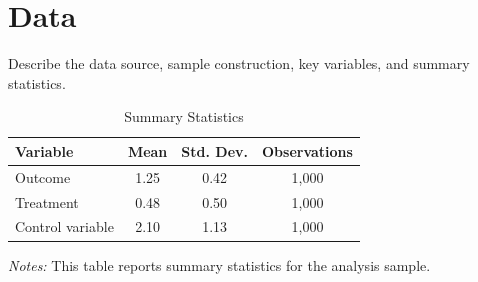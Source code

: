 \documentclass[11pt]{article}                 %
\begin{document}
\section{Data}\label{sec:data}

Describe the data source, sample construction, key variables, and summary statistics.

\begin{table}[htbp]                           %

\centering                                    %

\caption{Summary Statistics}                  %
\label{tab:summary}                           %

\begin{threeparttable}                        %

\begin{tabular}{lccc}                         %

\toprule                                      %

Variable & Mean & Std. Dev. & Observations \\ %

\midrule                                      %

Outcome & 1.25 & 0.42 & 1,000 \\              %
Treatment & 0.48 & 0.50 & 1,000 \\            %
Control variable & 2.10 & 1.13 & 1,000 \\     %

\bottomrule                                   %

\end{tabular}                                 %

\begin{tablenotes}[flushleft]                 %

\footnotesize                                 %

\item \textit{Notes:} This table reports summary statistics for the analysis sample.

\end{tablenotes}                              %
\end{threeparttable}                          %
\end{table}                                   %
\end{document}
